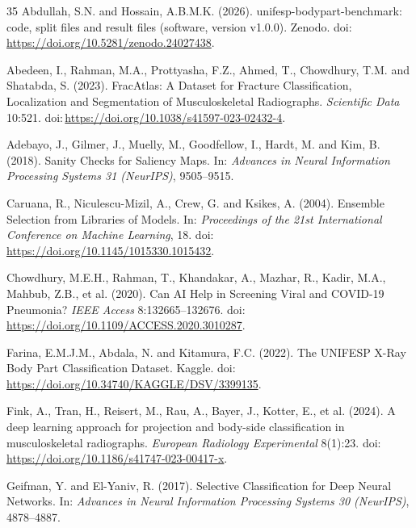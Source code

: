 \begin{thebibliography}{35}
Abdullah, S.N. and Hossain, A.B.M.K. (2026). unifesp-bodypart-benchmark: code, split files and result files (software, version v1.0.0). Zenodo. doi:\,\url{https://doi.org/10.5281/zenodo.24027438}.

Abedeen, I., Rahman, M.A., Prottyasha, F.Z., Ahmed, T., Chowdhury, T.M. and Shatabda, S. (2023). FracAtlas: A Dataset for Fracture Classification, Localization and Segmentation of Musculoskeletal Radiographs. \textit{Scientific Data} 10:521. doi:\,\url{https://doi.org/10.1038/s41597-023-02432-4}.

Adebayo, J., Gilmer, J., Muelly, M., Goodfellow, I., Hardt, M. and Kim, B. (2018). Sanity Checks for Saliency Maps. In: \textit{Advances in Neural Information Processing Systems 31 (NeurIPS)}, 9505--9515.

Caruana, R., Niculescu-Mizil, A., Crew, G. and Ksikes, A. (2004). Ensemble Selection from Libraries of Models. In: \textit{Proceedings of the 21st International Conference on Machine Learning}, 18. doi:\,\url{https://doi.org/10.1145/1015330.1015432}.

Chowdhury, M.E.H., Rahman, T., Khandakar, A., Mazhar, R., Kadir, M.A., Mahbub, Z.B., et al. (2020). Can AI Help in Screening Viral and COVID-19 Pneumonia? \textit{IEEE Access} 8:132665--132676. doi:\,\url{https://doi.org/10.1109/ACCESS.2020.3010287}.

Farina, E.M.J.M., Abdala, N. and Kitamura, F.C. (2022). The UNIFESP X-Ray Body Part Classification Dataset. Kaggle. doi:\,\url{https://doi.org/10.34740/KAGGLE/DSV/3399135}.

Fink, A., Tran, H., Reisert, M., Rau, A., Bayer, J., Kotter, E., et al. (2024). A deep learning approach for projection and body-side classification in musculoskeletal radiographs. \textit{European Radiology Experimental} 8(1):23. doi:\,\url{https://doi.org/10.1186/s41747-023-00417-x}.

Geifman, Y. and El-Yaniv, R. (2017). Selective Classification for Deep Neural Networks. In: \textit{Advances in Neural Information Processing Systems 30 (NeurIPS)}, 4878--4887.


\end{thebibliography}

